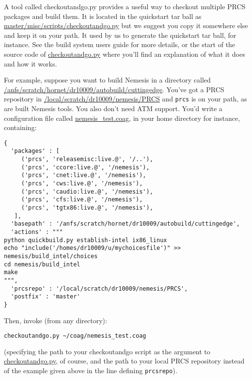 \documentclass[a4paper]{article}
\newcommand{\cmd}[1]{\texttt{#1}}
\newcommand{\file}[1]{\url{#1}}
\newcommand{\dir}[1]{\url{#1}}
\newcommand{\script}[1]{\url{#1}}
\begin{document}
\begin{enumerate}
A tool called checkoutandgo.py provides a useful way to checkout
  multiple PRCS packages and build them.  It is located in the
  quickstart tar ball as \script{master/misc/scripts/checkoutandgo.py}
  but we suggest you copy it somewhere else and keep it on your
  path. It used by us to generate the quickstart tar ball, for
  instance. See the build system users guide for more details, or the
  start of the source code of \script{checkoutandgo.py} where you'll
  find an explanation of what it does and how it works. 


For example, suppose you want to build Nemesis in a directory called
  \dir{/anfs/scratch/hornet/dr10009/autobuild/cuttingedge}. You've got a PRCS
  repository in \dir{/local/scratch/dr10009/nemesis/PRCS} and \cmd{prcs} is
  on your path, as are built Nemesis tools. You also don't need ATM
  support. You'd write a configuration file called
  \file{nemesis_test.coag}, in your home directory for instance,
  containing:

\begin{verbatim}
{
  'packages' : [
     ('prcs', 'releasemisc:live.@', '/..'),
     ('prcs', 'ccore:live.@', '/nemesis'),
     ('prcs', 'cnet:live.@', '/nemesis'),
     ('prcs', 'cws:live.@', '/nemesis'),
     ('prcs', 'caudio:live.@', '/nemesis'),
     ('prcs', 'cfs:live.@', '/nemesis'),
     ('prcs', 'tgtx86:live.@', '/nemesis'),
   ],
  'basepath' : '/anfs/scratch/hornet/dr10009/autobuild/cuttingedge',
  'actions' : """
python quickbuild.py establish-intel ix86_linux
echo "include('/homes/dr10009/u/mychoicesfile')" >> nemesis/build_intel/choices
cd nemesis/build_intel
make
""",
  'prcsrepo' : '/local/scratch/dr10009/nemesis/PRCS',
  'postfix' : 'master'
}
\end{verbatim}

Then, invoke (from any directory):

\begin{verbatim}
checkoutandgo.py ~/coag/nemesis_test.coag
\end{verbatim}

(specifying the path to your checkoutandgo script as the argument to
\script{checkoutandgo.py}, of course, and the path to your local PRCS
repository instead of the example given above in the line defining
\texttt{prcsrepo}).


\end{enumerate}
\end{document}
